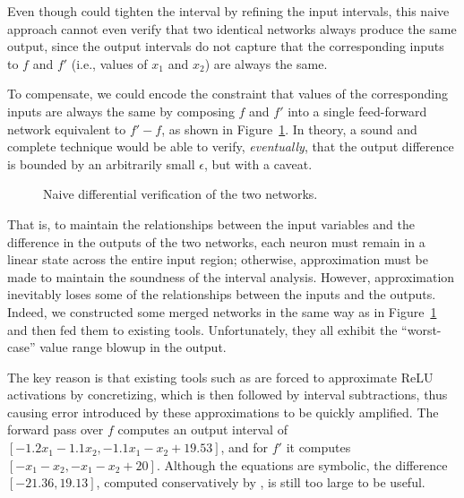 Even though \ReluVal{} could tighten the interval by refining the
input intervals, this naive approach cannot even verify that two
identical networks always produce the same output, since the output
intervals do not capture that the corresponding inputs to $ f $ and $
f' $ (i.e., values of $x_1$ and $x_2$) are always the same.


To compensate, we could encode the constraint that values of the
corresponding inputs are always the same by composing $ f $ and $ f' $
into a single feed-forward network equivalent to $ f' - f $, as shown
in Figure~\ref{fig:composed-network}. In theory, a sound and complete
technique would be able to verify, \textit{eventually}, that the
output difference is bounded by an arbitrarily small $\epsilon$, but
with a caveat.


\begin{figure}
\centering
\scalebox{0.8}{}
\caption{Naive differential verification of the two networks.}
\label{fig:composed-network}
\end{figure}%



That is, to maintain the relationships between the input variables and
the difference in the outputs of the two networks, each neuron must
remain in a linear state across the entire input region; otherwise,
approximation must be made to maintain the soundness of the interval
analysis.  However, approximation inevitably loses some of the
relationships between the inputs and the outputs.
%
Indeed, we constructed some merged
networks in the same way as in Figure~\ref{fig:composed-network} and
then fed them to existing tools.  Unfortunately, they all exhibit the
``worst-case'' value range blowup in the output.


The key reason is that existing tools such as \ReluVal{} are forced to
approximate ReLU activations by concretizing, which is then followed by
interval subtractions, thus causing error introduced by these approximations
to be quickly amplified.
%
The forward pass over $ f $ computes an output interval of $ [-1.2 x_1
- 1.1 x_2, -1.1 x_1 - x_2 + 19.53] $, and for $ f' $ it computes $
[-x_1 - x_2, -x_1 - x_2 + 20] $.  Although the equations are symbolic,
the difference $[-21.36, 19.13]$, computed conservatively
by \ReluVal{}, is still too large to be useful.



